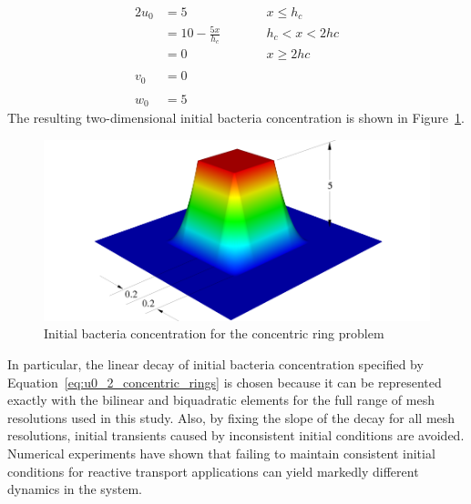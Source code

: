 \begin{alignat}{2}
  u_0 & = 5                   & \qquad & x \le h_c     \label{eq:u0_1_concentric_rings} \\
      & = 10 - \frac{5x}{h_c} & \qquad & h_c < x < 2hc \label{eq:u0_2_concentric_rings} \\
      & =0                    & \qquad & x \ge 2hc     \label{eq:u0_3_concentric_rings} \\
      &                       &        & \nonumber \\  
  v_0 & =0                    &        &               \label{eq:v0_concentric_rings}   \\
      &                       &        & \nonumber \\  
  w_0 & =5                    &        &               \label{eq:w0_concentric_rings}   
\end{alignat}
The resulting two-dimensional initial bacteria concentration is shown in Figure~\ref{fig:u0_concentric_rings}.
\begin{figure}[hbtp]
  \begin{center}
    \includegraphics[width=\textwidth]{figures/bio_concentric_rings/u0_schematic}
    \caption{Initial bacteria concentration for the concentric ring problem\label{fig:u0_concentric_rings}}
  \end{center}
\end{figure}
In particular, the linear decay of initial bacteria concentration specified by Equation~\eqref{eq:u0_2_concentric_rings} is chosen because it can be represented exactly with the bilinear and biquadratic elements for the full range of mesh resolutions used in this study.
Also, by fixing the slope of the decay for all mesh resolutions, initial transients caused by inconsistent initial conditions are avoided.  Numerical experiments have shown that failing to maintain consistent initial conditions for reactive transport applications can yield markedly different dynamics in the system. 

